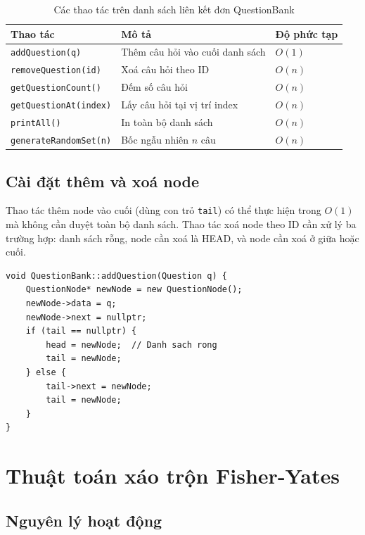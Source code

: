 \documentclass[11pt]{report}
\begin{document}
\begin{table}[H]
    \centering
    \begin{tabularx}{\textwidth}{|l|X|l|} \hline
        \textbf{Thao tác} & \textbf{Mô tả} & \textbf{Độ phức tạp} \\ \hline
        \texttt{addQuestion(q)} & Thêm câu hỏi vào cuối danh sách & $O(1)$ \\ \hline
        \texttt{removeQuestion(id)} & Xoá câu hỏi theo ID & $O(n)$ \\ \hline
        \texttt{getQuestionCount()} & Đếm số câu hỏi & $O(n)$ \\ \hline
        \texttt{getQuestionAt(index)} & Lấy câu hỏi tại vị trí index & $O(n)$ \\ \hline
        \texttt{printAll()} & In toàn bộ danh sách & $O(n)$ \\ \hline
        \texttt{generateRandomSet(n)} & Bốc ngẫu nhiên $n$ câu & $O(n)$ \\ \hline
    \end{tabularx}
    \caption{Các thao tác trên danh sách liên kết đơn QuestionBank}
    \label{tab:linkedlist}
\end{table}

\subsection{Cài đặt thêm và xoá node}

Thao tác thêm node vào cuối (dùng con trỏ \texttt{tail}) có thể thực hiện trong $O(1)$ mà không cần duyệt toàn bộ danh sách. Thao tác xoá node theo ID cần xử lý ba trường hợp: danh sách rỗng, node cần xoá là HEAD, và node cần xoá ở giữa hoặc cuối.

\begin{lstlisting}[caption={Thêm node vào cuối danh sách liên kết đơn}, label={lst:addnode}]
void QuestionBank::addQuestion(Question q) {
    QuestionNode* newNode = new QuestionNode();
    newNode->data = q;
    newNode->next = nullptr;
    if (tail == nullptr) {
        head = newNode;  // Danh sach rong
        tail = newNode;
    } else {
        tail->next = newNode;
        tail = newNode;
    }
}
\end{lstlisting}

\section{Thuật toán xáo trộn Fisher-Yates}

\subsection{Nguyên lý hoạt động}
\end{document}
